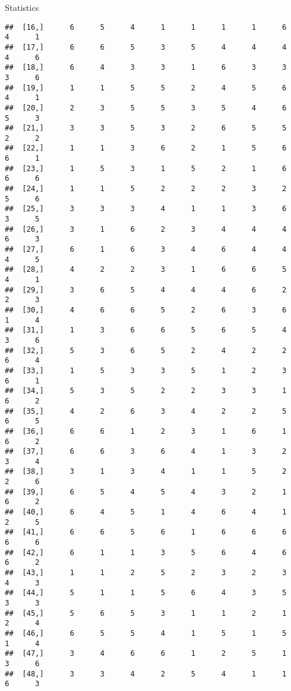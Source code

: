 \documentclass[
  ignorenonframetext,
]{beamer}
\begin{document}
\begin{frame}[fragile]{Statistics}
\begin{verbatim}
##  [16,]      6      5      4      1      1      1      1      6      4      1
##  [17,]      6      6      5      3      5      4      4      4      4      6
##  [18,]      6      4      3      3      1      6      3      3      3      6
##  [19,]      1      1      5      5      2      4      5      6      4      1
##  [20,]      2      3      5      5      3      5      4      6      5      3
##  [21,]      3      3      5      3      2      6      5      5      2      2
##  [22,]      1      1      3      6      2      1      5      6      6      1
##  [23,]      1      5      3      1      5      2      1      6      6      6
##  [24,]      1      1      5      2      2      2      3      2      5      6
##  [25,]      3      3      3      4      1      1      3      6      3      5
##  [26,]      3      1      6      2      3      4      4      4      6      3
##  [27,]      6      1      6      3      4      6      4      4      4      5
##  [28,]      4      2      2      3      1      6      6      5      4      1
##  [29,]      3      6      5      4      4      4      6      2      2      3
##  [30,]      4      6      6      5      2      6      3      6      1      4
##  [31,]      1      3      6      6      5      6      5      4      3      6
##  [32,]      5      3      6      5      2      4      2      2      6      4
##  [33,]      1      5      3      3      5      1      2      3      6      1
##  [34,]      5      3      5      2      2      3      3      1      6      2
##  [35,]      4      2      6      3      4      2      2      5      6      5
##  [36,]      6      6      1      2      3      1      6      1      6      2
##  [37,]      6      6      3      6      4      1      3      2      3      4
##  [38,]      3      1      3      4      1      1      5      2      2      6
##  [39,]      6      5      4      5      4      3      2      1      6      2
##  [40,]      6      4      5      1      4      6      4      1      2      5
##  [41,]      6      6      5      6      1      6      6      6      6      6
##  [42,]      6      1      1      3      5      6      4      6      6      2
##  [43,]      1      1      2      5      2      3      2      3      4      3
##  [44,]      5      1      1      5      6      4      3      5      3      3
##  [45,]      5      6      5      3      1      1      2      1      2      4
##  [46,]      6      5      5      4      1      5      1      5      1      4
##  [47,]      3      4      6      6      1      2      5      1      3      6
##  [48,]      3      3      4      2      5      4      1      1      6      3

\end{verbatim}
\end{frame}
\end{document}
